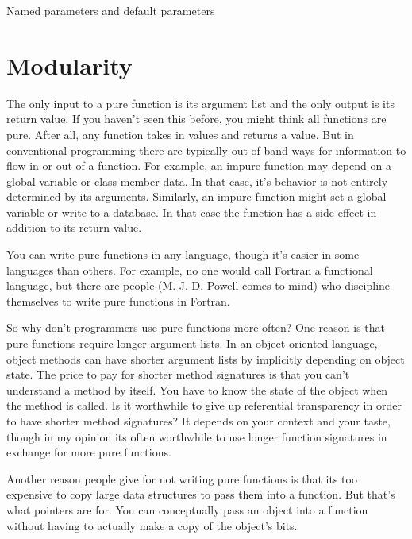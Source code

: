  


Named parameters and default parameters  

\newpage   
\section{Modularity} 


 
  The only input to a pure function is its argument list and the only output is its return value. 
  If you haven’t seen this before, you might 
  think all functions are pure. After all, any function takes in values and returns a value.
   But in conventional programming there are 
  typically out-of-band ways for information to flow in or out of a function. 
  For example, an impure function may depend on a global variable 
  or class member data. 
  In that case, it’s behavior is not entirely determined by its arguments. Similarly, an impure function might set a 
  global variable or write to a database. 
  In that case the function has a side effect in addition to its return value.
  
  You can write pure functions in any language, 
  though it’s easier in some languages than others. 
  For example, no one would call Fortran a 
  functional language, but there are people (M. J. D. Powell comes to mind)
   who discipline themselves to write pure functions in Fortran.
  
  
  
  
  So why don’t programmers use pure functions more often? 
  One reason is that pure functions require longer argument lists. 
  In an object 
  oriented language, object methods can have shorter argument lists 
  by implicitly depending on object state. 
  The price to pay for shorter 
  method signatures is that you can’t understand a method by itself. 
  You have to know the state of the object when the method is called. 
  Is 
  it worthwhile to give up referential transparency in order to have shorter method signatures? 
  It depends on your context and your taste, 
  though in my opinion its often worthwhile to use longer function 
  signatures in exchange for more pure functions.
  
  Another reason people give for not writing pure functions 
  is that its too expensive to copy large data structures to pass them into a 
  function. But that’s what pointers are for. You can conceptually 
  pass an object into a function without having to actually make a copy of 
  the object’s bits.
  
